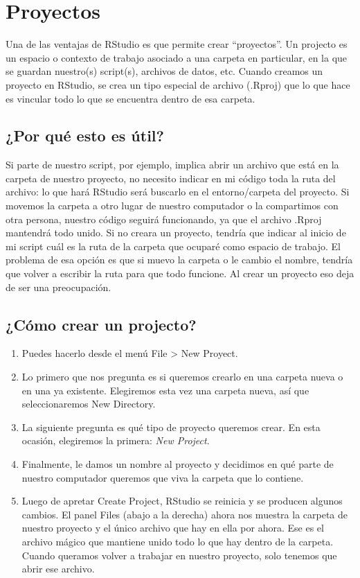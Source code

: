 \documentclass[12pt,]{book}
\providecommand{\tightlist}{%
  \setlength{\itemsep}{0pt}\setlength{\parskip}{0pt}}
\begin{document}
\section{Proyectos}\label{proyectos}

Una de las ventajas de RStudio es que permite crear ``proyectos''. Un
projecto es un espacio o contexto de trabajo asociado a una carpeta en
particular, en la que se guardan nuestro(s) script(s), archivos de
datos, etc. Cuando creamos un proyecto en RStudio, se crea un tipo
especial de archivo (.Rproj) que lo que hace es vincular todo lo que se
encuentra dentro de esa carpeta.

\subsection{¿Por qué esto es útil?}\label{por-que-esto-es-util}

Si parte de nuestro script, por ejemplo, implica abrir un archivo que
está en la carpeta de nuestro proyecto, no necesito indicar en mi código
toda la ruta del archivo: lo que hará RStudio será buscarlo en el
entorno/carpeta del proyecto. Si movemos la carpeta a otro lugar de
nuestro computador o la compartimos con otra persona, nuestro código
seguirá funcionando, ya que el archivo .Rproj mantendrá todo unido. Si
no creara un proyecto, tendría que indicar al inicio de mi script cuál
es la ruta de la carpeta que ocuparé como espacio de trabajo. El
problema de esa opción es que si muevo la carpeta o le cambio el nombre,
tendría que volver a escribir la ruta para que todo funcione. Al crear
un proyecto eso deja de ser una preocupación.

\subsection{¿Cómo crear un projecto?}\label{como-crear-un-projecto}

\begin{enumerate}
\def\labelenumi{\arabic{enumi}.}
\tightlist
\item
  Puedes hacerlo desde el menú File \textgreater{} New Proyect.
\item
  Lo primero que nos pregunta es si queremos crearlo en una carpeta
  nueva o en una ya existente. Elegiremos esta vez una carpeta nueva,
  así que seleccionaremos New Directory.
\item
  La siguiente pregunta es qué tipo de proyecto queremos crear. En esta
  ocasión, elegiremos la primera: \emph{New Project}.
\item
  Finalmente, le damos un nombre al proyecto y decidimos en qué parte de
  nuestro computador queremos que viva la carpeta que lo contiene.
\item
  Luego de apretar Create Project, RStudio se reinicia y se producen
  algunos cambios. El panel Files (abajo a la derecha) ahora nos muestra
  la carpeta de nuestro proyecto y el único archivo que hay en ella por
  ahora. Ese es el archivo mágico que mantiene unido todo lo que hay
  dentro de la carpeta. Cuando queramos volver a trabajar en nuestro
  proyecto, solo tenemos que abrir ese archivo.
\end{enumerate}
\end{document}
